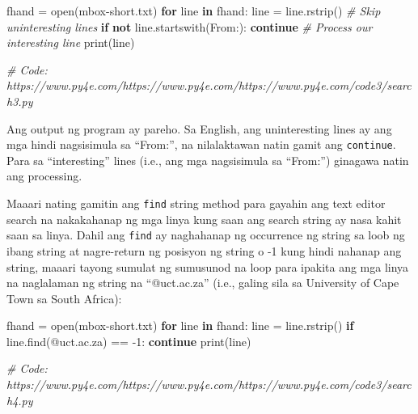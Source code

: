 \documentclass[10pt,]{book}
\newenvironment{Shaded}{}{}
\newcommand{\BuiltInTok}[1]{\textcolor[rgb]{0.00,0.50,0.00}{#1}}
\newcommand{\CommentTok}[1]{\textcolor[rgb]{0.38,0.63,0.69}{\textit{#1}}}
\newcommand{\ControlFlowTok}[1]{\textcolor[rgb]{0.00,0.44,0.13}{\textbf{#1}}}
\newcommand{\DecValTok}[1]{\textcolor[rgb]{0.25,0.63,0.44}{#1}}
\newcommand{\KeywordTok}[1]{\textcolor[rgb]{0.00,0.44,0.13}{\textbf{#1}}}
\newcommand{\NormalTok}[1]{#1}
\newcommand{\OperatorTok}[1]{\textcolor[rgb]{0.40,0.40,0.40}{#1}}
\newcommand{\StringTok}[1]{\textcolor[rgb]{0.25,0.44,0.63}{#1}}
\begin{document}
\begin{Shaded}
\begin{Highlighting}[]
\NormalTok{fhand }\OperatorTok{=} \BuiltInTok{open}\NormalTok{(}\StringTok{\textquotesingle{}mbox{-}short.txt\textquotesingle{}}\NormalTok{)}
\ControlFlowTok{for}\NormalTok{ line }\KeywordTok{in}\NormalTok{ fhand:}
\NormalTok{    line }\OperatorTok{=}\NormalTok{ line.rstrip()}
    \CommentTok{\# Skip \textquotesingle{}uninteresting lines\textquotesingle{}}
    \ControlFlowTok{if} \KeywordTok{not}\NormalTok{ line.startswith(}\StringTok{\textquotesingle{}From:\textquotesingle{}}\NormalTok{):}
        \ControlFlowTok{continue}
    \CommentTok{\# Process our \textquotesingle{}interesting\textquotesingle{} line}
    \BuiltInTok{print}\NormalTok{(line)}

\CommentTok{\# Code: https://www.py4e.com/https://www.py4e.com/https://www.py4e.com/code3/search3.py}
\end{Highlighting}
\end{Shaded}


Ang output ng program ay pareho. Sa English, ang uninteresting lines ay
ang mga hindi nagsisimula sa ``From:'', na nilalaktawan natin gamit ang
\texttt{continue}. Para sa ``interesting'' lines (i.e., ang mga
nagsisimula sa ``From:'') ginagawa natin ang processing.

Maaari nating gamitin ang \texttt{find} string method para gayahin ang
text editor search na nakakahanap ng mga linya kung saan ang search
string ay nasa kahit saan sa linya. Dahil ang \texttt{find} ay
naghahanap ng occurrence ng string sa loob ng ibang string at
nagre-return ng posisyon ng string o -1 kung hindi nahanap ang string,
maaari tayong sumulat ng sumusunod na loop para ipakita ang mga linya na
naglalaman ng string na ``@uct.ac.za'' (i.e., galing sila sa University
of Cape Town sa South Africa):

\begin{Shaded}
\begin{Highlighting}[]
\NormalTok{fhand }\OperatorTok{=} \BuiltInTok{open}\NormalTok{(}\StringTok{\textquotesingle{}mbox{-}short.txt\textquotesingle{}}\NormalTok{)}
\ControlFlowTok{for}\NormalTok{ line }\KeywordTok{in}\NormalTok{ fhand:}
\NormalTok{    line }\OperatorTok{=}\NormalTok{ line.rstrip()}
    \ControlFlowTok{if}\NormalTok{ line.find(}\StringTok{\textquotesingle{}@uct.ac.za\textquotesingle{}}\NormalTok{) }\OperatorTok{==} \OperatorTok{{-}}\DecValTok{1}\NormalTok{: }\ControlFlowTok{continue}
    \BuiltInTok{print}\NormalTok{(line)}

\CommentTok{\# Code: https://www.py4e.com/https://www.py4e.com/https://www.py4e.com/code3/search4.py}
\end{Highlighting}
\end{Shaded}
\end{document}
